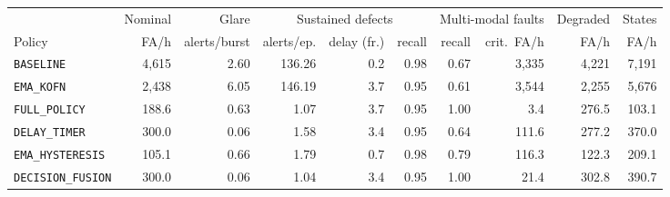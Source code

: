 \begin{tabular}{@{}lrrrrrrrrr@{}}
\toprule
 & Nominal & Glare & \multicolumn{3}{c}{Sustained defects} & \multicolumn{2}{c}{Multi-modal faults} & Degraded & States \\
\cmidrule(lr){4-6}\cmidrule(lr){7-8}
Policy & FA/h & alerts/burst & alerts/ep. & delay (fr.) & recall & recall & crit.\ FA/h & FA/h & FA/h \\
\midrule
\texttt{BASELINE} & 4{,}615 & 2.60 & 136.26 & 0.2 & 0.98 & 0.67 & 3{,}335 & 4{,}221 & 7{,}191 \\
\texttt{EMA\_KOFN} & 2{,}438 & 6.05 & 146.19 & 3.7 & 0.95 & 0.61 & 3{,}544 & 2{,}255 & 5{,}676 \\
\texttt{FULL\_POLICY} & 188.6 & 0.63 & 1.07 & 3.7 & 0.95 & 1.00 & 3.4 & 276.5 & 103.1 \\
\midrule
\texttt{DELAY\_TIMER} & 300.0 & 0.06 & 1.58 & 3.4 & 0.95 & 0.64 & 111.6 & 277.2 & 370.0 \\
\texttt{EMA\_HYSTERESIS} & 105.1 & 0.66 & 1.79 & 0.7 & 0.98 & 0.79 & 116.3 & 122.3 & 209.1 \\
\texttt{DECISION\_FUSION} & 300.0 & 0.06 & 1.04 & 3.4 & 0.95 & 1.00 & 21.4 & 302.8 & 390.7 \\
\bottomrule
\end{tabular}
